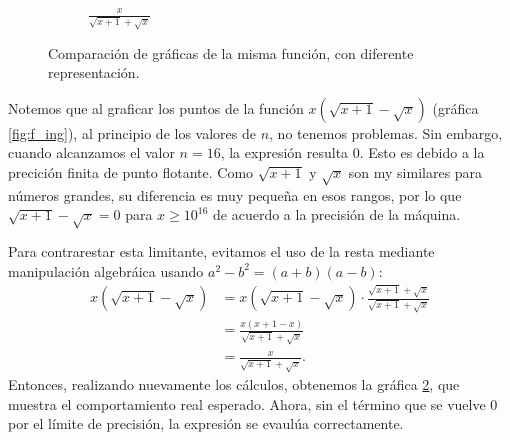 \begin{solution}
\begin{figure}[H]
\begin{subfigure}{.45\textwidth}
			\caption{$\frac{x}{\sqrt{x+1} + \sqrt{x}}$}
			\label{fig:f_r}
		\end{subfigure}
		\caption{Comparaci\'on de gr\'aficas de la misma funci\'on, con diferente representaci\'on.}
	\end{figure}
	Notemos que al graficar los puntos de la funci\'on $ x(\sqrt{x+1} - \sqrt{x})
	$ (gr\'afica  \ref{fig:f_ing}), al principio de los valores de $ n $, no tenemos problemas. Sin embargo,
	cuando alcanzamos el valor $ n = 16 $, la expresi\'on resulta 0. Esto es
	debido a la precici\'on finita de punto flotante. Como $ \sqrt{x+1} $ y $
		\sqrt{x} $ son my similares para n\'umeros grandes, su diferencia es muy
	peque\~na en esos rangos, por lo que $ \sqrt{x+1} - \sqrt{x} = 0 $ para $
		x\geq 10^{16} $ de acuerdo a la precisi\'on de la m\'aquina.

	Para contrarestar esta limitante, evitamos el uso de la resta mediante manipulaci\'on algebr\'aica usando $ a^2-b^2 = (a+b)(a-b) $:
	\begin{align*}
		x(\sqrt{x + 1} - \sqrt{x}) & = x(\sqrt{x + 1} - \sqrt{x})\cdot \frac{\sqrt{x+1} + \sqrt{x}}{\sqrt{x+1}+\sqrt{x}} \\
		                           & = \frac{x(x+1-x)}{\sqrt{x+1}+\sqrt{x}}                                              \\
		                           & = \frac{x}{\sqrt{x+1}+\sqrt{x}}.
	\end{align*}
	Entonces, realizando nuevamente los c\'alculos, obtenemos la gr\'afica
	\ref{fig:f_r}, que muestra el comportamiento real esperado. Ahora, sin el t\'ermino que se vuelve 0 por el l\'imite de precisi\'on, la expresi\'on se evaul\'ua correctamente.
\end{solution}


